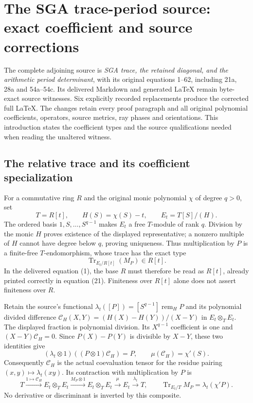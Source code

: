 \section{The SGA trace-period source: exact coefficient and source corrections}
\label{sec:sga-trace-period-source-corrections}

The complete adjoining source is \emph{SGA trace, the retained diagonal,
and the arithmetic period determinant}, with its original equations
1--62, including 21a, 28a and 54a--54c.  Its delivered Markdown and
generated LaTeX remain byte-exact source witnesses.  Six explicitly
recorded replacements produce the corrected full LaTeX.  The changes
retain every proof paragraph and all original polynomial coefficients,
operators, source metrics, ray phases and orientations.  This introduction
states the coefficient types and the source qualifications needed when
reading the unaltered witness.

\subsection{The relative trace and its coefficient specialization}

For a commutative ring $R$ and the original monic polynomial $\chi$ of
degree $q>0$, set
\[
 T=R[t],\qquad H(S)=\chi(S)-t,\qquad E_t=T[S]/(H).
 \tag{SGAC1}
\]
The ordered basis $1,S,\ldots,S^{q-1}$ makes $E_t$ a free
$T$-module of rank $q$.  Division by the monic $H$ proves existence
of the displayed representative; a nonzero multiple of $H$ cannot
have degree below $q$, proving uniqueness.  Thus multiplication by
$P$ is a finite-free $T$-endomorphism, whose trace has the exact type
\[
 \operatorname{Tr}_{E_t/R[t]}(M_P)\in R[t].
 \tag{SGAC2}
\]
In the delivered equation (1), the base $R$ must therefore be read as
$R[t]$, already printed correctly in equation (21).  Finiteness over
$R[t]$ alone does not assert finiteness over $R$.

Retain the source's functional
$\lambda_t([P])=[S^{q-1}]\operatorname{rem}_H P$ and its polynomial
divided difference $\mathcal C_H(X,Y)=(H(X)-H(Y))/(X-Y)$ in
$E_t\otimes_T E_t$.  The displayed fraction is polynomial division.
Its $X^{q-1}$ coefficient is one and
$(X-Y)\mathcal C_H=0$.  Since $P(X)-P(Y)$ is divisible by $X-Y$,
these two identities give
\[
 (\lambda_t\otimes1)((P\otimes1)\mathcal C_H)=P,
 \qquad \mu(\mathcal C_H)=\chi'(S).
 \tag{SGAC3}
\]
Consequently $\mathcal C_H$ is the actual coevaluation tensor for
the residue pairing $(x,y)\mapsto\lambda_t(xy)$.  Its contraction
with multiplication by $P$ is
\[
 T\xrightarrow{1\mapsto\mathcal C_H}E_t\otimes_T E_t
 \xrightarrow{M_P\otimes1}E_t\otimes_T E_t
 \xrightarrow{\mu}E_t\xrightarrow{\lambda_t}T,
 \qquad
 \operatorname{Tr}_{E_t/T}M_P=\lambda_t(\chi'P).
 \tag{SGAC4}
\]
No derivative or discriminant is inverted by this composite.

